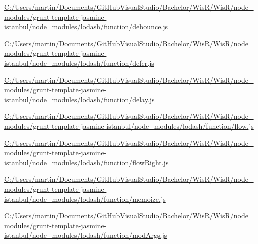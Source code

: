 \begin{DoxyCompactItemize}
\item 
\hyperlink{_c_1_2_users_2martin_2_documents_2_git_hub_visual_studio_2_bachelor_2_wis_r_2_wis_r_2node_module7dc90453c8994f73842a3b25e503aec3}{C\+:/\+Users/martin/\+Documents/\+Git\+Hub\+Visual\+Studio/\+Bachelor/\+Wis\+R/\+Wis\+R/node\+\_\+modules/grunt-\/template-\/jasmine-\/istanbul/node\+\_\+modules/lodash/function/debounce.\+js}
\item 
\hyperlink{_c_1_2_users_2martin_2_documents_2_git_hub_visual_studio_2_bachelor_2_wis_r_2_wis_r_2node_module44f38d44da3b829db9657634f8ef7551}{C\+:/\+Users/martin/\+Documents/\+Git\+Hub\+Visual\+Studio/\+Bachelor/\+Wis\+R/\+Wis\+R/node\+\_\+modules/grunt-\/template-\/jasmine-\/istanbul/node\+\_\+modules/lodash/function/defer.\+js}
\item 
\hyperlink{_c_1_2_users_2martin_2_documents_2_git_hub_visual_studio_2_bachelor_2_wis_r_2_wis_r_2node_modulee8d69e7d4329a3a7100e9b0d1d7151cf}{C\+:/\+Users/martin/\+Documents/\+Git\+Hub\+Visual\+Studio/\+Bachelor/\+Wis\+R/\+Wis\+R/node\+\_\+modules/grunt-\/template-\/jasmine-\/istanbul/node\+\_\+modules/lodash/function/delay.\+js}
\item 
\hyperlink{_c_1_2_users_2martin_2_documents_2_git_hub_visual_studio_2_bachelor_2_wis_r_2_wis_r_2node_module82dbf9ab076dab94deb72ec070a479b2}{C\+:/\+Users/martin/\+Documents/\+Git\+Hub\+Visual\+Studio/\+Bachelor/\+Wis\+R/\+Wis\+R/node\+\_\+modules/grunt-\/template-\/jasmine-\/istanbul/node\+\_\+modules/lodash/function/flow.\+js}
\item 
\hyperlink{_c_1_2_users_2martin_2_documents_2_git_hub_visual_studio_2_bachelor_2_wis_r_2_wis_r_2node_module8560d6ff8553e2c820e980192466b58a}{C\+:/\+Users/martin/\+Documents/\+Git\+Hub\+Visual\+Studio/\+Bachelor/\+Wis\+R/\+Wis\+R/node\+\_\+modules/grunt-\/template-\/jasmine-\/istanbul/node\+\_\+modules/lodash/function/flow\+Right.\+js}
\item 
\hyperlink{_c_1_2_users_2martin_2_documents_2_git_hub_visual_studio_2_bachelor_2_wis_r_2_wis_r_2node_modulee4f94f9e17cf7d482bb87b348b64f5b3}{C\+:/\+Users/martin/\+Documents/\+Git\+Hub\+Visual\+Studio/\+Bachelor/\+Wis\+R/\+Wis\+R/node\+\_\+modules/grunt-\/template-\/jasmine-\/istanbul/node\+\_\+modules/lodash/function/memoize.\+js}
\item 
\hyperlink{_c_1_2_users_2martin_2_documents_2_git_hub_visual_studio_2_bachelor_2_wis_r_2_wis_r_2node_module3fd4f1e6fd99e856b62d085b199b1173}{C\+:/\+Users/martin/\+Documents/\+Git\+Hub\+Visual\+Studio/\+Bachelor/\+Wis\+R/\+Wis\+R/node\+\_\+modules/grunt-\/template-\/jasmine-\/istanbul/node\+\_\+modules/lodash/function/mod\+Args.\+js}

\end{DoxyCompactItemize}
